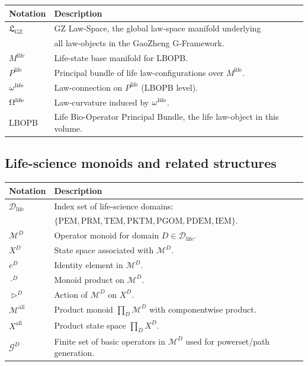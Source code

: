 \documentclass[11pt]{book}
\theoremstyle{plain}
\theoremstyle{definition}
\theoremstyle{remark}
\newcommand{\GZLS}{\ensuremath{\mathfrak{L}_{\mathrm{GZ}}}}       \newcommand{\GZLT}{\ensuremath{M_{!w}}}                           \newcommand{\GZLOC}{\ensuremath{A_M}}                             \newcommand{\GZLCurv}{\ensuremath{\mathcal{F}_{\mathrm{law}}}}
\begin{document}
\begin{center}
\begin{tabular}{ll}
\hline
Notation & Description \\
\hline
$\GZLS$ & GZ Law-Space, the global law-space manifold underlying \\
        & all law-objects in the GaoZheng G-Framework. \\
$M^{\mathrm{life}}$ & Life-state base manifold for LBOPB. \\
$P^{\mathrm{life}}$ & Principal bundle of life law-configurations over $M^{\mathrm{life}}$. \\
$\omega^{\mathrm{life}}$ & Law-connection on $P^{\mathrm{life}}$ (LBOPB level). \\
$\Omega^{\mathrm{life}}$ & Law-curvature induced by $\omega^{\mathrm{life}}$. \\
LBOPB & Life Bio-Operator Principal Bundle, the life law-object in this volume. \\
\hline
\end{tabular}
\end{center}

\subsection*{Life-science monoids and related structures}

\begin{center}
\begin{tabular}{ll}
\hline
Notation & Description \\
\hline
$\mathcal{D}_{\mathrm{life}}$ &
Index set of life-science domains: \\
& $\{\mathrm{PEM}, \mathrm{PRM}, \mathrm{TEM}, \mathrm{PKTM}, \mathrm{PGOM},
\mathrm{PDEM}, \mathrm{IEM}\}$. \\
$\mathcal{M}^{D}$ & Operator monoid for domain $D \in \mathcal{D}_{\mathrm{life}}$. \\
$X^{D}$ & State space associated with $\mathcal{M}^{D}$. \\
$e^{D}$ & Identity element in $\mathcal{M}^{D}$. \\
$\cdot^{D}$ & Monoid product on $\mathcal{M}^{D}$. \\
$\triangleright^{D}$ & Action of $\mathcal{M}^{D}$ on $X^{D}$. \\
$\mathcal{M}^{\mathrm{all}}$ & Product monoid $\prod_{D} \mathcal{M}^{D}$ with componentwise product. \\
$X^{\mathrm{all}}$ & Product state space $\prod_{D} X^{D}$. \\
$\mathcal{G}^{D}$ & Finite set of basic operators in $\mathcal{M}^{D}$ used for powerset/path generation. \\
\hline
\end{tabular}
\end{center}
\end{document}
